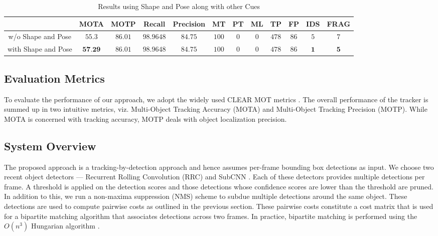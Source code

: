 \documentclass[letterpaper, 10 pt, conference]{ieeeconf}
\begin{document}
\begin{table*}[!hbt]
	\centering
    \caption{Results using Shape and Pose along with other Cues }
	\begin{tabular}{|c|c|c|c|c|c|c|c|c|c|c|c|}
		\hline\hline
    	 &  MOTA & MOTP & Recall & Precision & MT & PT & ML & TP & FP & IDS & FRAG \\
      	\hline\hline
		w/o Shape and Pose & $55.3$ & $86.01$ & $98.9648$ & $84.75$ & $100$ & $0$ & $0$ & $478$ & $86$ & $5$ & $7$  \\
        \hline
        with Shape and Pose & $\textbf{57.29}$ & $86.01$ & $98.9648$ & $84.75$ & $100$ & $0$ & $0$ & $478$ & $86$ & $\textbf{1}$ & $\textbf{5}$  \\
          
      \hline
 	\end{tabular}
    \label{table:shape_pose}
\end{table*}















\subsection{Evaluation Metrics}
To evaluate the performance of our approach, we adopt the widely used CLEAR MOT metrics \cite{CLEARMOT}. The overall performance of the tracker is summed up in two intuitive metrics, viz. Multi-Object Tracking Accuracy (MOTA) and Multi-Object Tracking Precision (MOTP). While MOTA is concerned with tracking accuracy, MOTP deals with object localization precision.

\subsection{System Overview}
The proposed approach is a tracking-by-detection approach and hence assumes per-frame bounding box detections as input. We choose two recent object detectors --- Recurrent Rolling Convolution (RRC) \cite{RRC} and SubCNN \cite{SubCNN}. Each of these detectors provides multiple detections per frame. A threshold is applied on the detection scores and those detections whose confidence scores are lower than the threshold are pruned. In addition to this, we run a non-maxima suppression (NMS) scheme to subdue multiple detections around the same object. These detections are used to compute pairwise costs as outlined in the previous section. These pairwise costs constitute a cost matrix that is used for a bipartite matching algorithm that associates detections across two frames. In practice, bipartite matching is performed using the $O(n^3)$ Hungarian algorithm \cite{hungarian}.
\end{document}
